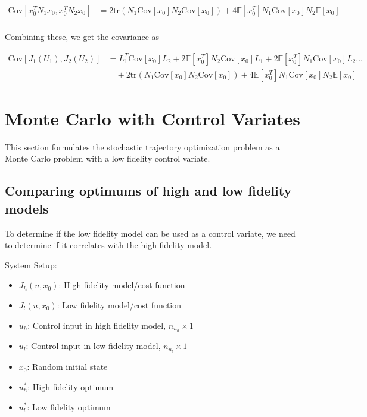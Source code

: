 \documentclass{article}
\begin{document}
\begin{equation}
  \begin{aligned}
    \text{Cov}[x_0^T N_1 x_0, x_0^T N_2 x_0] &= 2 \text{tr}(N_1 \text{Cov}[x_0] N_2 \text{Cov}[x_0]) + 4 \mathbb{E}[x_0^T]N_1\text{Cov}[x_0]N_2\mathbb{E}[x_0] \\
  \end{aligned}
\end{equation}

Combining these, we get the covariance as

\begin{equation}
  \begin{aligned}
    \text{Cov}[J_1(U_1), J_2(U_2)] &= L_1^T \text{Cov}[x_0] L_2 + 2 \mathbb{E}[x_0^T] N_2 \text{Cov}[x_0] L_1 + 2 \mathbb{E}[x_0^T] N_1 \text{Cov}[x_0] L_2 \hdots \\
    & \quad + 2 \text{tr}(N_1 \text{Cov}[x_0] N_2 \text{Cov}[x_0]) + 4 \mathbb{E}[x_0^T]N_1\text{Cov}[x_0]N_2\mathbb{E}[x_0]
  \end{aligned}
\end{equation}

\section{Monte Carlo with Control Variates}

This section formulates the stochastic trajectory optimization problem as a Monte Carlo problem with a low fidelity control variate.

\subsection{Comparing optimums of high and low fidelity models} \label{comp_opt}

To determine if the low fidelity model can be used as a control variate, we need to determine if it correlates with the high fidelity model.

System Setup:
\begin{itemize}
  \item $J_h(u, x_0)$: High fidelity model/cost function
  \item $J_l(u, x_0)$: Low fidelity model/cost function
  \item $u_h$: Control input in high fidelity model, $n_{u_h} \times 1$
  \item $u_l$: Control input in low fidelity model, $n_{u_l} \times 1$
  \item $x_0$: Random initial state
  \item $u_h^*$: High fidelity optimum
  \item $u_l^*$: Low fidelity optimum
\end{itemize}
\end{document}
